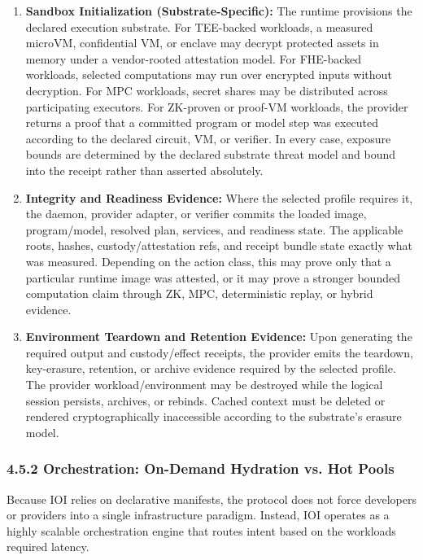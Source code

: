 \documentclass[
  11pt,
]{article}
\providecommand{\tightlist}{%
  \setlength{\itemsep}{0pt}\setlength{\parskip}{0pt}}
\begin{document}
\begin{enumerate}
\def\labelenumi{\arabic{enumi}.}
\tightlist
\item
  \textbf{Sandbox Initialization (Substrate-Specific):} The runtime
  provisions the declared execution substrate. For TEE-backed workloads,
  a measured microVM, confidential VM, or enclave may decrypt protected
  assets in memory under a vendor-rooted attestation model. For
  FHE-backed workloads,
  selected computations may run over encrypted inputs without
  decryption. For MPC workloads, secret shares may be distributed across
  participating executors. For ZK-proven or proof-VM workloads, the
  provider returns a proof that a committed program or model step was
  executed according to the declared circuit, VM, or verifier. In every
  case, exposure bounds are determined by the declared substrate threat
  model and bound into the receipt rather than asserted absolutely.
\item
  \textbf{Integrity and Readiness Evidence:} Where the selected profile
  requires it, the daemon, provider adapter, or verifier commits the loaded
  image, program/model, resolved plan, services, and readiness state. The
  applicable roots, hashes, custody/attestation refs, and receipt bundle state
  exactly what was measured. Depending on the action class, this
  may prove only that a particular runtime image was attested, or it may
  prove a stronger bounded computation claim through ZK, MPC,
  deterministic replay, or hybrid evidence.
\item
  \textbf{Environment Teardown and Retention Evidence:} Upon generating the
  required output and custody/effect receipts, the provider emits the teardown,
  key-erasure, retention, or archive evidence required by the selected profile.
  The provider workload/environment may be destroyed while the logical session
  persists, archives, or rebinds. Cached context must be deleted or rendered
  cryptographically inaccessible according to the substrate's erasure model.
\end{enumerate}

\hypertarget{orchestration-on-demand-hydration-vs.-hot-pools}{%
\subsubsection{4.5.2 Orchestration: On-Demand Hydration vs. Hot
Pools}\label{orchestration-on-demand-hydration-vs.-hot-pools}}

Because IOI relies on declarative manifests, the protocol does not force
developers or providers into a single infrastructure paradigm. Instead,
IOI operates as a highly scalable orchestration engine that routes
intent based on the workload\textquotesingle s required latency.
\end{document}

